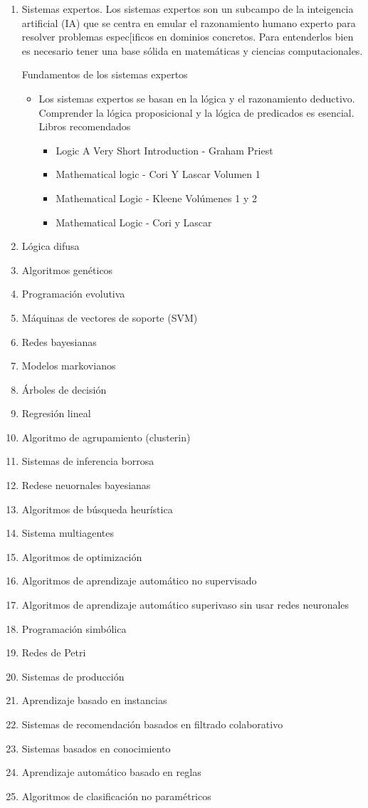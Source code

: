 \documentclass{article}
\begin{document}
\begin{enumerate}
\item Sistemas expertos.
Los sistemas expertos son un subcampo de la inteigencia artificial (IA) que se centra en emular el razonamiento humano experto para resolver problemas espec[ificos en dominios concretos. Para entenderlos bien es necesario tener una base s\'olida en matem\'aticas y ciencias computacionales.
\begin{center}
Fundamentos de los sistemas expertos
\end{center}
\begin{itemize}
\item Los sistemas expertos se basan en la l\'ogica y el razonamiento deductivo. Comprender la l\'ogica proposicional y la l\'ogica de predicados es esencial. Libros recomendados 
\begin{itemize}
\item Logic A Very Short Introduction - Graham Priest
\item Mathematical logic - Cori Y Lascar Volumen 1
\item Mathematical Logic - Kleene Vol\'umenes 1 y 2
\item Mathematical Logic - Cori y Lascar
\end{itemize}
\end{itemize}

\item L\'ogica difusa
\item Algoritmos gen\'eticos
\item Programaci\'on evolutiva
\item M\'aquinas de vectores de soporte (SVM)
\item Redes bayesianas
\item Modelos markovianos
\item \'Arboles de decisi\'on
\item Regresi\'on lineal
\item Algoritmo de agrupamiento (clusterin)
	\item Sistemas de inferencia borrosa
	\item Redese neuornales bayesianas
	\item Algoritmos de b\'usqueda heur\'istica
	\item Sistema multiagentes
	\item Algoritmos de optimizaci\'on
	\item Algoritmos de aprendizaje autom\'atico no supervisado
	\item Algoritmos de aprendizaje autom\'atico superivaso sin usar redes neuronales
	\item Programaci\'on simb\'olica
	\item Redes de Petri
	\item Sistemas de producci\'on 
	\item Aprendizaje basado en instancias
	\item Sistemas de recomendaci\'on basados en filtrado colaborativo
	\item Sistemas basados en conocimiento
	\item Aprendizaje autom\'atico basado en reglas
	\item Algoritmos de clasificaci\'on no param\'etricos
\end{enumerate}
\end{document}
